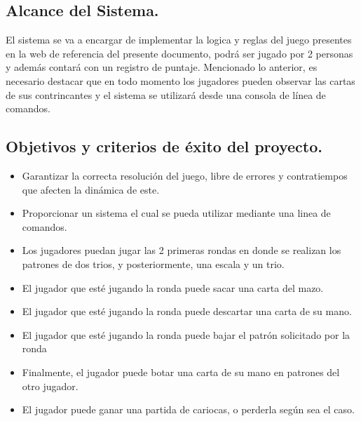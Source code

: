 \subsection{Alcance del Sistema.}\label{cap:alcance}
El sistema se va a encargar de implementar la logica y reglas del juego presentes en la web de referencia del presente documento, 
podrá ser jugado por 2 personas y además contará con un registro de puntaje. Mencionado lo anterior, es necesario destacar 
que en todo momento los jugadores pueden observar las cartas de sus contrincantes y el sistema se utilizará desde una consola de línea de comandos.

\subsection{Objetivos y criterios de éxito del proyecto.}\label{cap:objetivos}
\begin{itemize}
    \item Garantizar la correcta resolución del juego, libre de errores y contratiempos que afecten la dinámica de este.
    \item Proporcionar un sistema el cual se pueda utilizar mediante una linea de comandos.
    \item Los jugadores puedan jugar las 2 primeras rondas en donde se realizan los patrones de dos trios, y posteriormente, una
    escala y un trio.
    \item El jugador que esté jugando la ronda puede sacar una carta del mazo.
    \item El jugador que esté jugando la ronda puede descartar una carta de su mano.
    \item El jugador que esté jugando la ronda puede bajar el patrón solicitado por la ronda
    \item Finalmente, el jugador puede botar una carta de su mano en patrones del otro jugador.
    \item El jugador puede ganar una partida de cariocas, o perderla según sea el caso.
\end{itemize}

\pagebreak
